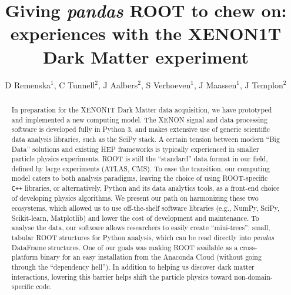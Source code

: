 \documentclass[a4paper]{jpconf}
\begin{document}
\def\code#1{\texttt{#1}}
\title{Giving \textit{pandas} ROOT to chew on: experiences with the XENON1T Dark Matter experiment}

\author{D Remenska$^{1}$, C Tunnell$^{2}$, J Aalbers$^{2}$, S Verhoeven$^{1}$, J Maassen$^{1}$, J Templon$^{2}$}
\address{$^{1}$Netherlands eScience Center, Science Park 140, Amsterdam, The 
Netherlands}
\address{$^{2}$National Institute for High Energy Physics (NIKHEF), Science 
Park 
105, Amsterdam, The Netherlands}

\begin{abstract}
In preparation for the XENON1T Dark Matter data acquisition, 
we have prototyped and implemented a new computing model. 
The XENON signal and data processing software is developed fully in Python 3, and makes extensive use of generic scientific data analysis libraries, such as the SciPy stack.
A certain tension between modern ``Big Data'' solutions and 
existing HEP frameworks is typically experienced in smaller particle physics experiments.
ROOT is still the ``standard'' data format in our field, defined by large experiments (ATLAS, CMS).
To ease the transition, our computing model caters to both analysis paradigms, leaving the choice of using ROOT-specific \texttt{C++} libraries, 
or alternatively, Python and its data analytics tools, as a front-end choice
of developing physics algorithms. 
We present our path on harmonizing these two ecosystems, which allowed us to use off-the-shelf software libraries
(e.g., NumPy, SciPy, Scikit-learn, Matplotlib) and lower the cost of development and maintenance. 
To analyse the data, our software allows researchers to easily create “mini-trees”;
small, tabular ROOT structures for Python analysis, which can be read directly into \textit{pandas}
DataFrame structures. One of our goals was making ROOT available as a cross-platform binary for an easy
installation from the Anaconda Cloud (without going through the ``dependency hell'').
In addition to helping us discover dark matter interactions, lowering this barrier helps shift the particle physics
toward non-domain-specific code.


\end{abstract}
\end{document}
